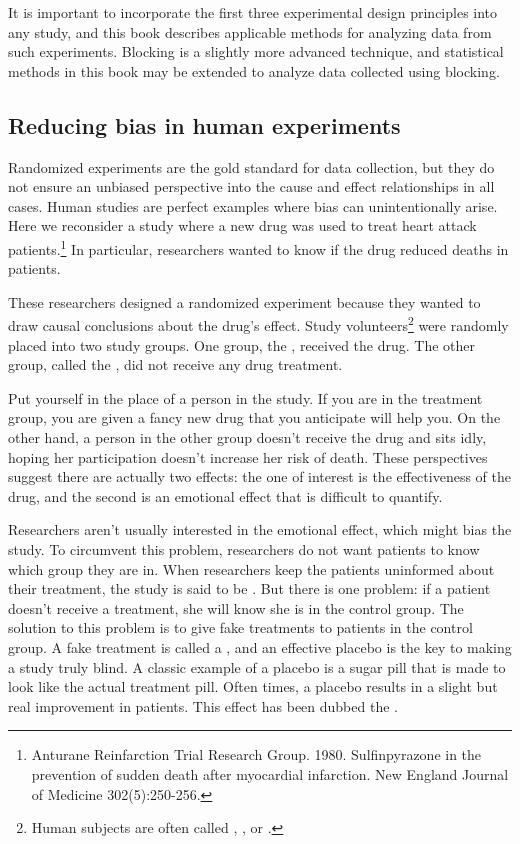 It is important to incorporate the first three experimental design principles into any study, and this book describes applicable methods for analyzing data from such experiments. Blocking is a slightly more advanced technique, and statistical methods in this book may be extended to analyze data collected using blocking.

\subsection{Reducing bias in human experiments}
\label{biasInHumanExperiments}

Randomized experiments are the gold standard for data collection, but they do not ensure an unbiased perspective into the cause and effect relationships in all cases. Human studies are perfect examples where bias can unintentionally arise. Here we reconsider a study where a new drug was used to treat heart attack patients.\footnote{Anturane Reinfarction Trial Research Group. 1980. Sulfinpyrazone in the prevention of sudden death after myocardial infarction. New England Journal of Medicine 302(5):250-256.} In particular, researchers wanted to know if the drug reduced deaths in patients.

These researchers designed a randomized experiment because they wanted to draw causal conclusions about the drug's effect. Study volunteers\footnote{Human subjects are often called , , or .} were randomly placed into two study groups. One group, the , received the drug. The other group, called the , did not receive any drug treatment.

Put yourself in the place of a person in the study. If you are in the treatment group, you are given a fancy new drug that you anticipate will help you. On the other hand, a person in the other group doesn't receive the drug and sits idly, hoping her participation doesn't increase her risk of death. These perspectives suggest there are actually two effects: the one of interest is the effectiveness of the drug, and the second is an emotional effect that is difficult to quantify.

Researchers aren't usually interested in the emotional effect, which might bias the study. To circumvent this problem, researchers do not want patients to know which group they are in. When researchers keep the patients uninformed about their treatment, the study is said to be . But there is one problem: if a patient doesn't receive a treatment, she will know she is in the control group. The solution to this problem is to give fake treatments to patients in the control group. A fake treatment is called a , and an effective placebo is the key to making a study truly blind. A classic example of a placebo is a sugar pill that is made to look like the actual treatment pill. Often times, a placebo results in a slight but real improvement in patients. This effect has been dubbed the .

